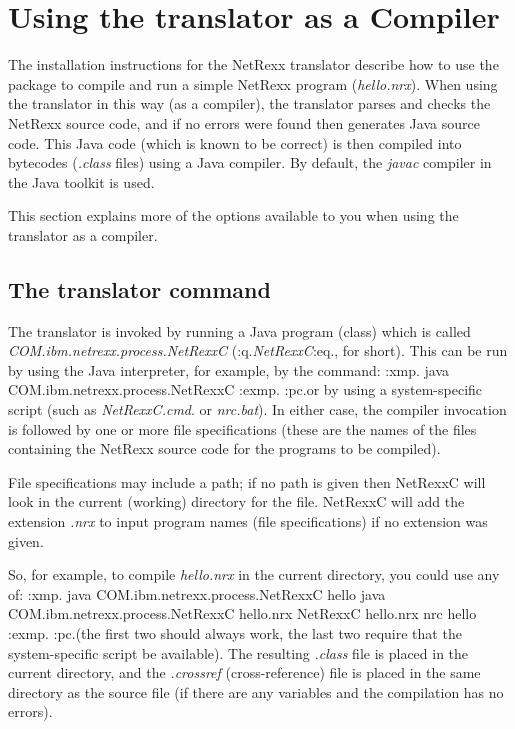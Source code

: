 \chapter{Using the translator as a Compiler}
The installation instructions for the NetRexx translator describe how to
use the package to compile and run a simple NetRexx program
(\emph{hello.nrx}).  When using the translator in this way (as a
compiler), the translator parses and checks the NetRexx source code, and
if no errors were found then generates Java source code.  This Java code
(which is known to be correct) is then compiled into bytecodes
(\emph{.class} files) using a Java compiler.  By default,
the \emph{javac} compiler in the Java toolkit is used.

This section explains more of the options available to you when using
the translator as a compiler.
\section{The translator command}

The translator is invoked by running a Java program (class) which is
called \emph{COM.ibm.netrexx.process.NetRexxC} (:q.\emph{NetRexxC}:eq.,
for short).  This can be run by using the Java interpreter, for example,
by the command:
:xmp.
java COM.ibm.netrexx.process.NetRexxC
:exmp.
:pc.or by using a system-specific script (such as \emph{NetRexxC.cmd}.
or \emph{nrc.bat}).  In either case, the compiler invocation is followed
by one or more file specifications (these are the names of the files
containing the NetRexx source code for the programs to be compiled).

File specifications may include a path; if no path is given then
NetRexxC will look in the current (working) directory for the file.
NetRexxC will add the extension \emph{.nrx} to input program names (file
specifications) if no extension was given.

So, for example, to compile \emph{hello.nrx} in the current directory,
you could use any of:
:xmp.
java COM.ibm.netrexx.process.NetRexxC hello
java COM.ibm.netrexx.process.NetRexxC hello.nrx
NetRexxC hello.nrx
nrc hello
:exmp.
:pc.(the first two should always work, the last two require that the
system-specific script be available).  The resulting \emph{.class} file
is placed in the current directory, and the \emph{.crossref}
(cross-reference) file is placed in the same directory as the source
file (if there are any variables and the compilation has no errors).


